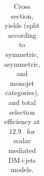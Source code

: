 \begin{table}
{\begin{tabular}{rrlrrrrr}
    \hline\hline
    \end{tabular}
    }
    \caption{Cross section, yields (split according to symmetric, asymmetric, 
        and monojet categories), and total selection efficiency at $12.9$~\ifb 
        for scalar mediated DM+jets models.}
    \label{tab:DMS_yld}
\end{table}

